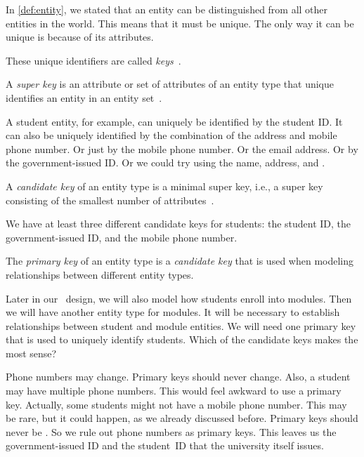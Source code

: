 %
%
%
In \cref{def:entity}, we stated that an entity can be distinguished from all other entities in the world.
This means that it must be unique.
The only way it can be unique is because of its attributes.

These unique identifiers are called \emph{keys}~\cite{S2024D:CDMERDE}.%
%
\begin{definition}%
A \emph{super key} is an attribute or set of attributes of an entity type that unique identifies an entity in an entity set~\cite{S2024D:CDMERDE,G2011EW2ITDS:CMUTERM}.%
\end{definition}%
%
A student entity, for example, can uniquely be identified by the student ID.
It can also be uniquely identified by the combination of the address and mobile phone number.
Or just by the mobile phone number.
Or the email address.
Or by the government-issued ID.
Or we could try using the name, address, and .%
%
\begin{definition}%
A \emph{candidate key} of an entity type is a minimal super key, i.e., a super key consisting of the smallest number of attributes~\cite{S2024D:CDMERDE,G2011EW2ITDS:CMUTERM}.%
\end{definition}%
%
We have at least three different candidate keys for students:
the student ID, the government-issued ID, and the mobile phone number.%
%
\begin{definition}%
\label{sec:primaryKey}%
The \emph{primary key} of an entity type is a \emph{candidate key} that is used when modeling relationships between different entity types.%
\end{definition}%
%
Later in our \db\ design, we will also model how students enroll into modules.
Then we will have another entity type for modules.
It will be necessary to establish relationships between student and module entities.
We will need one primary key that is used to uniquely identify students.
Which of the candidate keys makes the most sense?

Phone numbers may change.
Primary keys should never change.
Also, a student may have multiple phone numbers.
This would feel awkward to use a primary key.
Actually, some students might not have a mobile phone number.
This may be rare, but it could happen, as we already discussed before.
Primary keys should never be .
So we rule out phone numbers as primary keys.
This leaves us the government-issued ID and the student~ID that the university itself issues.

